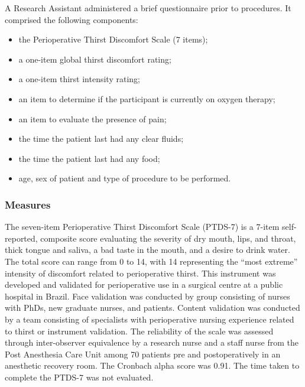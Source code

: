 \documentclass[12pt,twocolumn,twoside,]{pinp}
\providecommand{\tightlist}{%
  \setlength{\itemsep}{0pt}\setlength{\parskip}{0pt}}
\begin{document}
A Research Assistant administered a brief questionnaire prior to
procedures. It comprised the following components:

\begin{itemize}
\tightlist
\item
  the Perioperative Thirst Discomfort Scale (7 items);
\item
  a one-item global thirst discomfort rating;
\item
  a one-item thirst intensity rating;
\item
  an item to determine if the participant is currently on oxygen
  therapy;
\item
  an item to evaluate the presence of pain;
\item
  the time the patient last had any clear fluids;
\item
  the time the patient last had any food;
\item
  age, sex of patient and type of procedure to be performed.
\end{itemize}

\hypertarget{measures}{%
\subsubsection{Measures}\label{measures}}

The seven-item Perioperative Thirst Discomfort Scale (PTDS-7) is a
7-item self-reported, composite score evaluating the severity of dry
mouth, lips, and throat, thick tongue and saliva, a bad taste in the
mouth, and a desire to drink water. The total score can range from 0 to
14, with 14 representing the ``most extreme'' intensity of discomfort
related to perioperative thirst. This instrument was developed and
validated for perioperative use in a surgical centre at a public
hospital in Brazil. Face validation was conducted by group consisting of
nurses with PhDs, new graduate nurses, and patients. Content validation
was conducted by a team consisting of specialists with perioperative
nursing experience related to thirst or instrument validation. The
reliability of the scale was assessed through inter-observer equivalence
by a research nurse and a staff nurse from the Post Anesthesia Care Unit
among 70 patients pre and postoperatively in an anesthetic recovery
room. The Cronbach alpha score was 0.91. The time taken to complete the
PTDS-7 was not evaluated.
\end{document}
